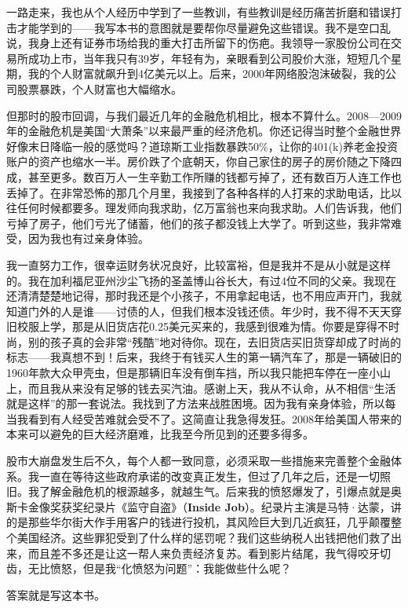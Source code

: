 一路走来，我也从个人经历中学到了一些教训，有些教训是经历痛苦折磨和错误打击才能学到的——我写本书的意图就是要帮你尽量避免这些错误。我不是空口乱说，我身上还有证券市场给我的重大打击所留下的伤疤。我领导一家股份公司在交易所成功上市，当年我只有39岁，年轻有为，亲眼看到公司股价大涨，短短几个星期，我的个人财富就飙升到4亿美元以上。后来，2000年网络股泡沫破裂，我的公司股票暴跌，个人财富也大幅缩水。

但那时的股市回调，与我们最近几年的金融危机相比，根本不算什么。2008—2009年的金融危机是美国“大萧条”以来最严重的经济危机。你还记得当时整个金融世界好像末日降临一般的感觉吗？道琼斯工业指数暴跌50\%，让你的401(k)养老金投资账户的资产也缩水一半。房价跌了个底朝天，你自己家住的房子的房价随之下降四成，甚至更多。数百万人一生辛勤工作所赚的钱都亏掉了，还有数百万人连工作也丢掉了。在非常恐怖的那几个月里，我接到了各种各样的人打来的求助电话，比以往任何时候都要多。理发师向我求助，亿万富翁也来向我求助。人们告诉我，他们亏掉了房子，他们亏光了储蓄，他们的孩子都没钱上大学了。听到这些，我非常难受，因为我也有过亲身体验。

我一直努力工作，很幸运财务状况良好，比较富裕，但是我并不是从小就是这样的。我在加利福尼亚州沙尘飞扬的圣盖博山谷长大，有过4位不同的父亲。我现在还清清楚楚地记得，那时我还是个小孩子，不用拿起电话，也不用应声开门，我就知道门外的人是谁——讨债的人，但我们根本没钱还债。年少时，我不得不天天穿旧校服上学，那是从旧货店花0.25美元买来的，我感到很难为情。你要是穿得不时尚，别的孩子真的会非常“残酷”地对待你。现在，去旧货店买旧货穿却成了时尚的标志——我真想不到！后来，我终于有钱买人生的第一辆汽车了，那是一辆破旧的1960年款大众甲壳虫，但是那辆旧车没有倒车挡，所以我只能把车停在一座小山上，而且我从来没有足够的钱去买汽油。感谢上天，我从不认命，从不相信“生活就是这样”的那一套说法。我找到了方法来战胜困境。因为我有亲身体验，所以每当我看到有人经受苦难就会受不了。这简直让我急得发狂。2008年给美国人带来的本来可以避免的巨大经济磨难，比我至今所见到的还要多得多。

股市大崩盘发生后不久，每个人都一致同意，必须采取一些措施来完善整个金融体系。我一直在等待这些政府承诺的改变真正发生，但过了几年之后，还是一切照旧。我了解金融危机的根源越多，就越生气。后来我的愤怒爆发了，引爆点就是奥斯卡金像奖获奖纪录片《监守自盗》（\textbf{Inside Job}）。纪录片主演是马特·达蒙，讲的是那些华尔街大作手用客户的钱进行投机，其风险巨大到几近疯狂，几乎颠覆整个美国经济。这些罪犯受到了什么样的惩罚呢？我们这些纳税人出钱把他们救了出来，而且差不多还是让这一帮人来负责经济复苏。看到影片结尾，我气得咬牙切齿，无比愤怒，但是我“化愤怒为问题”：我能做些什么呢？

答案就是写这本书。

